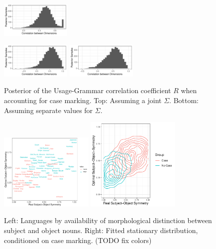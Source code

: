 \documentclass[11pt,a4paper]{article}
\newcommand\mhahn[1]{{\color{red}(#1)}}
\begin{document}
\begin{figure}
    \centering
    \includegraphics[width=0.3\textwidth]{../change/visualize/figures/corr_ornuhl-binom_42.pdf}
    
    \includegraphics[width=0.3\textwidth]{../change/visualize/figures/corr_ornuhl-binom_45_Case.pdf}
    \includegraphics[width=0.3\textwidth]{../change/visualize/figures/corr_ornuhl-binom_45_NoCase.pdf}
    \caption{Posterior of the Usage-Grammar correlation coefficient $R$ when accounting for case marking. Top: Assuming a joint $\Sigma$. Bottom: Assuming separate values for $\Sigma$.}
    \label{fig:posterior-case}
\end{figure}

\begin{figure}
    \centering
    \includegraphics[width=0.4\textwidth]{../analysis/figures/by_patient_marking.pdf}
    \includegraphics[width=0.4\textwidth]{../change/visualize/stationary_case.pdf}
    \caption{Left: Languages by availability of morphological distinction between subject and object nouns. Right: Fitted stationary distribution, conditioned on case marking. \mhahn{TODO fix colors}}
    \label{fig:langs-case}
\end{figure}
\end{document}

